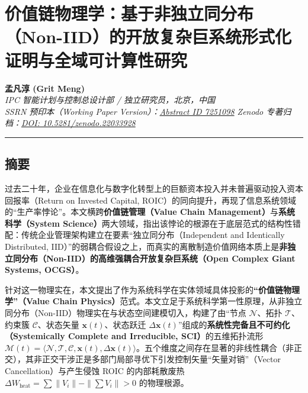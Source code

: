 \documentclass[
]{article}
\author{}
\date{}
\begin{document}
\section{价值链物理学：基于非独立同分布（Non-IID）的开放复杂巨系统形式化证明与全域可计算性研究}\label{ux4ef7ux503cux94feux7269ux7406ux5b66ux57faux4e8eux975eux72ecux7acbux540cux5206ux5e03non-iidux7684ux5f00ux653eux590dux6742ux5de8ux7cfbux7edfux5f62ux5f0fux5316ux8bc1ux660eux4e0eux5168ux57dfux53efux8ba1ux7b97ux6027ux7814ux7a76}

\textbf{孟凡淳 (Grit Meng)}\\
\emph{IPC 智能计划与控制总设计部 / 独立研究员，北京，中国}\\
\emph{SSRN 预印本（Working Paper
Version）：\href{https://papers.ssrn.com/sol3/papers.cfm?abstract_id=7251098}{Abstract
ID 7251098} \textbar{} Zenodo
专著归档：\href{https://doi.org/10.5281/zenodo.22033928}{DOI:
10.5281/zenodo.22033928}}

\begin{center}\rule{0.5\linewidth}{0.5pt}\end{center}

\subsection{摘要}\label{ux6458ux8981}

过去二十年，企业在信息化与数字化转型上的巨额资本投入并未普遍驱动投入资本回报率（Return
on Invested Capital,
ROIC）的同向提升，再现了信息系统领域的``生产率悖论''。本文横跨\textbf{价值链管理（Value
Chain Management）}与\textbf{系统科学（System
Science）}两大领域，指出该悖论的根源在于底层范式的结构性错配：传统企业管理架构建立在要素``独立同分布（Independent
and Identically Distributed,
IID）''的弱耦合假设之上，而真实的离散制造价值网络本质上是\textbf{非独立同分布（Non-IID）的高维强耦合开放复杂巨系统（Open
Complex Giant Systems, OCGS）}。

针对这一物理实在，本文提出了作为系统科学在实体领域具体投影的\textbf{``价值链物理学''（Value
Chain
Physics）}范式。本文立足于系统科学第一性原理，从非独立同分布（Non-IID）物理实在与状态空间建模切入，构建了由``节点
\(\mathcal{N}\)、拓扑 \(\mathcal{T}\)、约束簇 \(\mathcal{C}\)、状态矢量
\(\mathbf{x}(t)\)、状态跃迁
\(\Delta\mathbf{x}(t)\)''组成的\textbf{系统性完备且不可约化（Systemically
Complete and Irreducible, SCI）}的五维拓扑流形
\(\mathcal{M}(t) = \langle\mathcal{N},\mathcal{T},\mathcal{C},\mathbf{x}(t),\Delta\mathbf{x}(t)\rangle\)。五个维度之间存在显著的非线性耦合（非正交），其非正交干涉正是多部门局部寻优下引发控制矢量``矢量对销''（Vector
Cancellation）与产生侵蚀 ROIC 的内部耗散废热
\(\Delta W_{\text{heat}} = \sum \|V_i\| - \|\sum V_i\| > 0\)
的物理根源。
\end{document}
